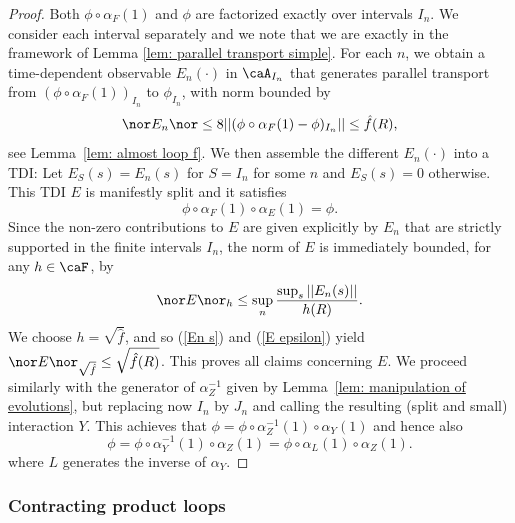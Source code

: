 \begin{proof}
	Both $\phi \circ \alpha_{F}(1)$ and $\phi$ are factorized exactly over intervals $I_n$. We consider each interval separately and we note that we are exactly in the framework of Lemma \ref{lem: parallel transport simple}. For each $n$, we obtain a time-dependent observable $E_{n}(\cdot)$ in $ \caA_{I_n}$
	that generates parallel transport from $(\phi \circ \alpha_{F}(1))_{I_n}$ to $\phi_{I_n}$, with norm bounded by 
	\begin{equation}\label{En s}
		\nor E_n \nor \leq 8 || (\phi \circ \alpha_{F}(1)-\phi)_{I_n}    || \leq  \hat{f}(R),
	\end{equation}
	see Lemma~\ref{lem: almost loop f}. We then assemble the different $E_n(\cdot)$ into a TDI: Let $
	E_S(s)= E_n(s) $ for $S=I_n$ for some $n$ and $E_S(s)=0$ otherwise.
	This TDI $E$ is manifestly split and it satisfies
	$$
	\phi \circ \alpha_{F}(1) \circ \alpha_E(1)=\phi.
	$$
	Since the non-zero contributions to $E$ are given explicitly by $E_n$ that are strictly supported in the finite intervals $I_n$, the norm of $E$ is immediately bounded, for any $h \in \caF$, by
	\begin{equation}\label{E epsilon}
		\nor E \nor_h\leq \sup_n \frac{\sup_{s}||E_n(s)||}{h(R)}.
	\end{equation}
	We choose $h=\sqrt{\hat{f}}$, and so (\ref{En s}) and (\ref{E epsilon}) yield $\nor E \nor_{\sqrt{\hat{f}}}\leq \sqrt{\hat{f}(R)}$. This proves all claims concerning $E$.
	We proceed similarly with the generator of $\alpha_Z^{-1}$ given by Lemma~\ref{lem: manipulation of evolutions}, but replacing now $I_n$ by $J_n$ and calling the resulting (split and small) interaction $Y$. This achieves that $\phi = \phi  \circ \alpha_{Z}^{-1}(1) \circ \alpha_{Y}(1) 
	$ and hence also 
	$$
	\phi = \phi  \circ \alpha_{Y}^{-1}(1) \circ \alpha_{Z}(1) 
	= \phi  \circ \alpha_{L}(1) \circ \alpha_{Z}(1).
	$$
	where $L$ generates the inverse of $\alpha_Y$.
\end{proof}


\subsubsection{Contracting product loops}

